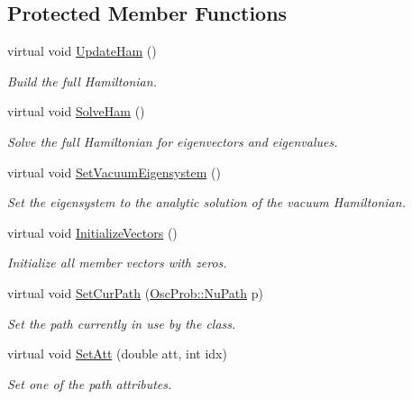 \subsection*{Protected Member Functions}
\begin{DoxyCompactItemize}
\item 
virtual void \hyperlink{classOscProb_1_1PMNS__Fast_a16248082308f9d2c332ebf1be0aa90c3}{Update\+Ham} ()
\begin{DoxyCompactList}\small\item\em Build the full Hamiltonian. \end{DoxyCompactList}\item 
virtual void \hyperlink{classOscProb_1_1PMNS__Fast_a8a0828401591e88c60e0051fbfe02d5e}{Solve\+Ham} ()
\begin{DoxyCompactList}\small\item\em Solve the full Hamiltonian for eigenvectors and eigenvalues. \end{DoxyCompactList}\item 
virtual void \hyperlink{classOscProb_1_1PMNS__Fast_a76dd5a761df8689c502b28ad0391f9e2}{Set\+Vacuum\+Eigensystem} ()
\begin{DoxyCompactList}\small\item\em Set the eigensystem to the analytic solution of the vacuum Hamiltonian. \end{DoxyCompactList}\item 
virtual void \hyperlink{classOscProb_1_1PMNS__Base_adf23b569112f9f9e0e592f01d79a5f3d}{Initialize\+Vectors} ()
\begin{DoxyCompactList}\small\item\em Initialize all member vectors with zeros. \end{DoxyCompactList}\item 
virtual void \hyperlink{classOscProb_1_1PMNS__Base_a986e6ebef09a7e2eb7fee16a4c2c834d}{Set\+Cur\+Path} (\hyperlink{structOscProb_1_1NuPath}{Osc\+Prob\+::\+Nu\+Path} p)
\begin{DoxyCompactList}\small\item\em Set the path currently in use by the class. \end{DoxyCompactList}\item 
virtual void \hyperlink{classOscProb_1_1PMNS__Base_aba565962a440d14bee7a2a96d2eca2c5}{Set\+Att} (double att, int idx)
\begin{DoxyCompactList}\small\item\em Set one of the path attributes. \end{DoxyCompactList}\item 

\end{DoxyCompactItemize}
